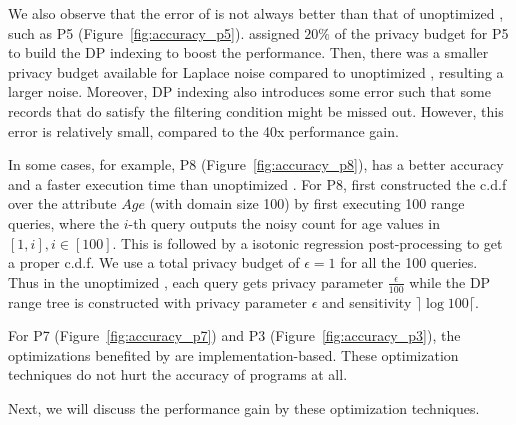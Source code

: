 We also observe that the error of \system is not always better than that of unoptimized \system, such as P5 (Figure~\ref{fig:accuracy_p5}). \system assigned $20\%$ of the privacy budget for P5 to build the DP indexing to boost the performance. Then, there was a smaller privacy budget available for Laplace noise compared to unoptimized \system, resulting a larger noise. Moreover, DP indexing also introduces some error such that some records that do satisfy the filtering condition might be missed out. However, this error is relatively small, compared to the 40x performance gain.

In some cases, for example, P8 (Figure~\ref{fig:accuracy_p8}), \system has a better accuracy and a faster execution time than unoptimized \system. For P8, \system first constructed the c.d.f over the attribute $Age$ (with domain size 100) by first executing 100 range queries, where the $i$-th query outputs the noisy count for age values in $[1,i], i \in [100]$. This is followed by a isotonic regression post-processing to get a proper c.d.f. We use a total privacy budget of $\epsilon=1$ for all the 100 queries. Thus in the unoptimized \system, each query gets privacy parameter $\frac{\epsilon}{100}$ while the DP range tree is constructed with privacy parameter $\epsilon$ and sensitivity $\rceil\log 100\lceil$.  


For P7 (Figure~\ref{fig:accuracy_p7}) and P3 (Figure~\ref{fig:accuracy_p3}), the optimizations benefited by \system are implementation-based. These optimization techniques do not hurt the accuracy of \system programs at all.

Next, we will discuss the performance gain by these optimization techniques.

